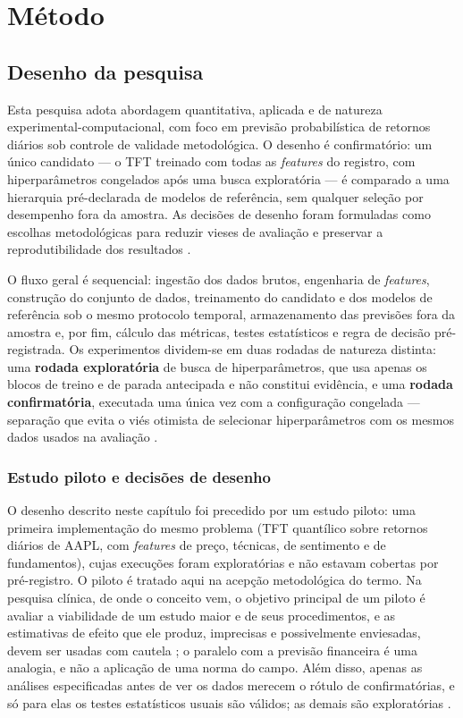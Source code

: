 \chapter{Método} \label{chap:metodo}


\section{Desenho da pesquisa}
Esta pesquisa adota abordagem quantitativa, aplicada e de natureza experimental-computacional, com foco em previsão probabilística de retornos diários sob controle de validade metodológica. O desenho é confirmatório: um único candidato --- o TFT treinado com todas as \textit{features} do registro, com hiperparâmetros congelados após uma busca exploratória --- é comparado a uma hierarquia pré-declarada de modelos de referência, sem qualquer seleção por desempenho fora da amostra. As decisões de desenho foram formuladas como escolhas metodológicas para reduzir vieses de avaliação e preservar a reprodutibilidade dos resultados \cite{PINEAU2021REPRODUCIBILITY}.

O fluxo geral é sequencial: ingestão dos dados brutos, engenharia de \textit{features}, construção do conjunto de dados, treinamento do candidato e dos modelos de referência sob o mesmo protocolo temporal, armazenamento das previsões fora da amostra e, por fim, cálculo das métricas, testes estatísticos e regra de decisão pré-registrada. Os experimentos dividem-se em duas rodadas de natureza distinta: uma \textbf{rodada exploratória} de busca de hiperparâmetros, que usa apenas os blocos de treino e de parada antecipada e não constitui evidência, e uma \textbf{rodada confirmatória}, executada uma única vez com a configuração congelada --- separação que evita o viés otimista de selecionar hiperparâmetros com os mesmos dados usados na avaliação \cite{RASCHKA2018}.

\subsection{Estudo piloto e decisões de desenho} \label{sec:piloto}
O desenho descrito neste capítulo foi precedido por um estudo piloto: uma primeira implementação do mesmo problema (TFT quantílico sobre retornos diários de AAPL, com \textit{features} de preço, técnicas, de sentimento e de fundamentos), cujas execuções foram exploratórias e não estavam cobertas por pré-registro. O piloto é tratado aqui na acepção metodológica do termo. Na pesquisa clínica, de onde o conceito vem, o objetivo principal de um piloto é avaliar a viabilidade de um estudo maior e de seus procedimentos, e as estimativas de efeito que ele produz, imprecisas e possivelmente enviesadas, devem ser usadas com cautela \cite{THABANE2010}; o paralelo com a previsão financeira é uma analogia, e não a aplicação de uma norma do campo. Além disso, apenas as análises especificadas antes de ver os dados merecem o rótulo de confirmatórias, e só para elas os testes estatísticos usuais são válidos; as demais são exploratórias \cite{WAGENMAKERS2012}.

